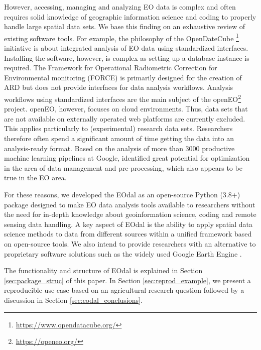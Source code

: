 However, accessing, managing and analyzing \gls{EO} data is complex and often requires solid knowledge of geographic information science and coding to properly handle large spatial data sets. We base this finding on an exhaustive review of existing software tools. For example, the philosophy of the OpenDateCube \footnote{\url{https://www.opendatacube.org/}} initiative is about integrated analysis of \gls{EO} data using standardized interfaces. Installing the software, however, is complex as setting up a database instance is required. The Framework for Operational Radiometric Correction for Environmental monitoring (FORCE) \citep{frantz_forcelandsat_2019} is primarily designed for the creation of \gls{ARD} but does not provide interfaces for data analysis workflows. Analysis workflows using standardized interfaces are the main subject of the openEO\footnote{\url{https://openeo.org/}} project. openEO, however, focuses on cloud environments. Thus, data sets that are not available on externally operated web platforms are currently excluded. This applies particularly to (experimental) research data sets. Researchers therefore often spend a significant amount of time getting the data into an analysis-ready format. Based on the analysis of more than 3000 productive machine learning pipelines at Google, \citet{xin_production_2021} identified great potential for optimization in the area of data management and pre-processing, which also appears to be true in the \gls{EO} area.

For these reasons, we developed the \gls{EOdal} as an open-source Python (3.8+) package designed to make \gls{EO} data analysis tools available to researchers without the need for in-depth knowledge about geoinformation science, coding and remote sensing data handling. A key aspect of \gls{EOdal} is the ability to apply spatial data science methods to data from different sources within a unified framework based on open-source tools. We also intend to provide researchers with an alternative to proprietary software solutions such as the widely used Google Earth Engine \citep{gorelick_google_2017}.

The functionality and structure of \gls{EOdal} is explained in Section \ref{sec:package_struc} of this paper. In Section \ref{sec:reprod_example}, we present a reproducible use case based on an agricultural research question followed by a discussion in Section \ref{sec:eodal_conclusions}.

